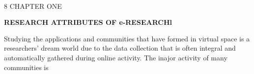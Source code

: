 ‎\documentclass[a4paper,12pt]{book}‎
\begin{document}
\vspace{9mm}
\begin{flushleft}
\hspace{-20mm}
8
\hspace{6mm}
CHAPTER ONE
\end{flushleft} 
\vspace{4mm}

\vspace{2mm}
\hspace{-2.5cm}
\textbf{RESEARCH ATTRIBUTES OF e-RESEARCHl}
\vspace{5mm}

Studying the applications and communities that have formed in virtual space is a researchers' dream world due to the data collection that is often integral and automatically gathered during online activity. The inajor activity of many communities is
\end{document}
